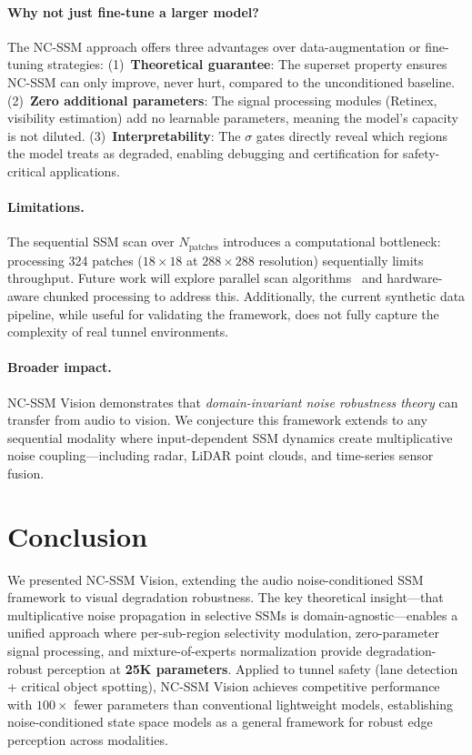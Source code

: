 \documentclass[10pt,twocolumn,letterpaper]{article}
\begin{document}
\paragraph{Why not just fine-tune a larger model?}
The NC-SSM approach offers three advantages over data-augmentation or fine-tuning strategies:
(1)~\textbf{Theoretical guarantee}: The superset property ensures NC-SSM can only improve, never hurt, compared to the unconditioned baseline.
(2)~\textbf{Zero additional parameters}: The signal processing modules (Retinex, visibility estimation) add no learnable parameters, meaning the model's capacity is not diluted.
(3)~\textbf{Interpretability}: The $\sigma$ gates directly reveal which regions the model treats as degraded, enabling debugging and certification for safety-critical applications.

\paragraph{Limitations.}
The sequential SSM scan over $N_{\text{patches}}$ introduces a computational bottleneck: processing 324 patches ($18 \times 18$ at $288 \times 288$ resolution) sequentially limits throughput.
Future work will explore parallel scan algorithms~\cite{blelloch1990prefix} and hardware-aware chunked processing to address this.
Additionally, the current synthetic data pipeline, while useful for validating the framework, does not fully capture the complexity of real tunnel environments.

\paragraph{Broader impact.}
NC-SSM Vision demonstrates that \emph{domain-invariant noise robustness theory} can transfer from audio to vision.
We conjecture this framework extends to any sequential modality where input-dependent SSM dynamics create multiplicative noise coupling---including radar, LiDAR point clouds, and time-series sensor fusion.


\section{Conclusion}
\label{sec:conclusion}

We presented NC-SSM Vision, extending the audio noise-conditioned SSM framework to visual degradation robustness.
The key theoretical insight---that multiplicative noise propagation in selective SSMs is domain-agnostic---enables a unified approach where per-sub-region selectivity modulation, zero-parameter signal processing, and mixture-of-experts normalization provide degradation-robust perception at \textbf{25K parameters}.
Applied to tunnel safety (lane detection + critical object spotting), NC-SSM Vision achieves competitive performance with $100\times$ fewer parameters than conventional lightweight models, establishing noise-conditioned state space models as a general framework for robust edge perception across modalities.


{\small


}
\end{document}
